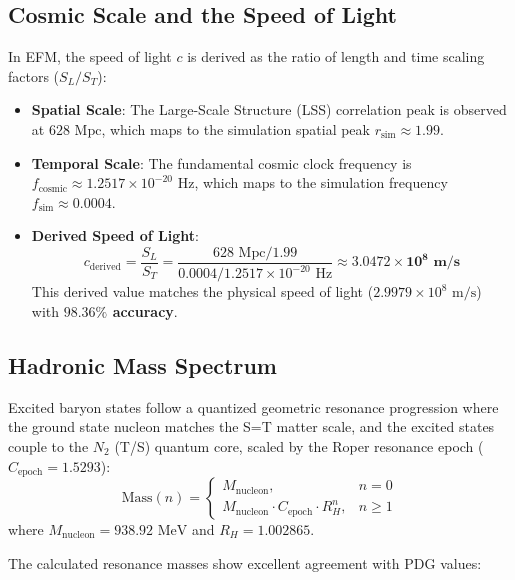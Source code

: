 \documentclass[11pt, twoside]{article}
\begin{document}
\subsection{Cosmic Scale and the Speed of Light}
In EFM, the speed of light \(c\) is derived as the ratio of length and time scaling factors (\(S_L / S_T\)):
\begin{itemize}
    \item \textbf{Spatial Scale}: The Large-Scale Structure (LSS) correlation peak is observed at \(628\text{ Mpc}\), which maps to the simulation spatial peak \(r_{\text{sim}} \approx 1.99\).
    \item \textbf{Temporal Scale}: The fundamental cosmic clock frequency is \(f_{\text{cosmic}} \approx 1.2517 \times 10^{-20}\text{ Hz}\), which maps to the simulation frequency \(f_{\text{sim}} \approx 0.0004\).
    \item \textbf{Derived Speed of Light}:
      \begin{equation}
      c_{\text{derived}} = \frac{S_L}{S_T} = \frac{628\text{ Mpc} / 1.99}{0.0004 / 1.2517 \times 10^{-20}\text{ Hz}} \approx \mathbf{3.0472 \times 10^8\text{ m/s}}
      \end{equation}
      This derived value matches the physical speed of light (\(2.9979 \times 10^8\text{ m/s}\)) with \textbf{\(98.36\%\) accuracy}.
\end{itemize}

\subsection{Hadronic Mass Spectrum}
Excited baryon states follow a quantized geometric resonance progression where the ground state nucleon matches the S=T matter scale, and the excited states couple to the \(N_2\) (T/S) quantum core, scaled by the Roper resonance epoch (\(C_{\text{epoch}} = 1.5293\)):
\begin{equation}
\text{Mass}(n) = \begin{cases} 
M_{\text{nucleon}}, & n = 0 \\
M_{\text{nucleon}} \cdot C_{\text{epoch}} \cdot R_H^n, & n \ge 1
\end{cases}
\end{equation}
where \(M_{\text{nucleon}} = 938.92\text{ MeV}\) and \(R_H = 1.002865\). 

The calculated resonance masses show excellent agreement with PDG values:
\end{document}
